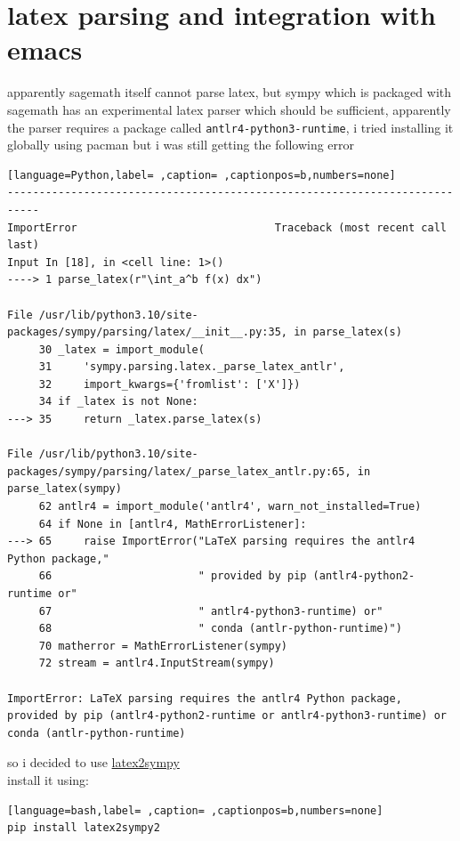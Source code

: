 \documentclass[a4paper,12pt]{article}
\begin{document}
\section{latex parsing and integration with emacs}
\label{sec:org6faee3c}
apparently sagemath itself cannot parse latex, but sympy which is packaged with sagemath has an experimental latex parser which should be sufficient, apparently the parser requires a package called \texttt{antlr4-python3-runtime}, i tried installing it globally using pacman but i was still getting the following error\\[0pt]

\begin{lstlisting}[language=Python,label= ,caption= ,captionpos=b,numbers=none]
---------------------------------------------------------------------------
ImportError                               Traceback (most recent call last)
Input In [18], in <cell line: 1>()
----> 1 parse_latex(r"\int_a^b f(x) dx")

File /usr/lib/python3.10/site-packages/sympy/parsing/latex/__init__.py:35, in parse_latex(s)
     30 _latex = import_module(
     31     'sympy.parsing.latex._parse_latex_antlr',
     32     import_kwargs={'fromlist': ['X']})
     34 if _latex is not None:
---> 35     return _latex.parse_latex(s)

File /usr/lib/python3.10/site-packages/sympy/parsing/latex/_parse_latex_antlr.py:65, in parse_latex(sympy)
     62 antlr4 = import_module('antlr4', warn_not_installed=True)
     64 if None in [antlr4, MathErrorListener]:
---> 65     raise ImportError("LaTeX parsing requires the antlr4 Python package,"
     66                       " provided by pip (antlr4-python2-runtime or"
     67                       " antlr4-python3-runtime) or"
     68                       " conda (antlr-python-runtime)")
     70 matherror = MathErrorListener(sympy)
     72 stream = antlr4.InputStream(sympy)

ImportError: LaTeX parsing requires the antlr4 Python package, provided by pip (antlr4-python2-runtime or antlr4-python3-runtime) or conda (antlr-python-runtime)
\end{lstlisting}

so i decided to use \href{https://github.com/OrangeX4/latex2sympy}{latex2sympy}\\[0pt]

install it using:\\[0pt]

\begin{lstlisting}[language=bash,label= ,caption= ,captionpos=b,numbers=none]
pip install latex2sympy2
\end{lstlisting}
\end{document}
